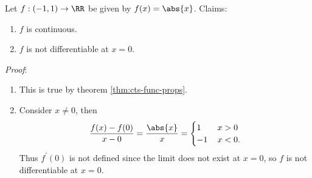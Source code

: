 \documentclass[../real_analysis.tex]{subfiles}
\begin{document}
            \begin{example}
                Let $f:(-1,1)\to\RR$ be given by $f(x)=\abs{x}$. Claims:
                \begin{enumerate}[label={\upshape(\roman*)}]
                    \item $f$ is continuous.
                    \item $f$ is not differentiable at $x=0$.
                \end{enumerate}
                \textit{Proof}:
                \begin{enumerate}[label={\upshape(\roman*)}]
                    \item This is true by theorem \ref{thm:cts-func-props}.
                    \item Consider $x\neq 0$, then
                    \begin{equation}
                        \frac{f(x)-f(0)}{x-0}=\frac{\abs{x}}{x}=\begin{cases}
                            1\,&x>0\\
                            -1\,&x<0.
                        \end{cases}
                    \end{equation}
                    Thus $f^\prime(0)$ is not defined since the limit does not exist at $x=0$, so $f$ is not differentiable at $x=0$.
                \end{enumerate}
            \end{example}
\end{document}
